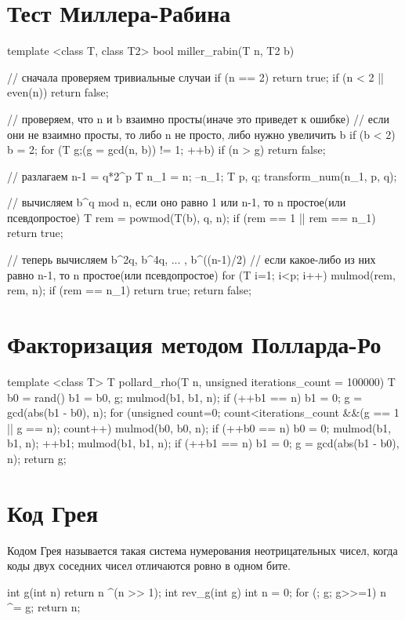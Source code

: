 \documentclass[12pt, titlepage]{article}
\begin{document}
\section{Тест Миллера-Рабина}
\begin{cppcode}
template <class T, class T2>
bool miller_rabin(T n, T2 b)
{
    // сначала проверяем тривиальные случаи
    if (n == 2)
        return true;
    if (n < 2 || even(n))
        return false;

    // проверяем, что n и b взаимно просты(иначе это приведет к ошибке)
    // если они не взаимно просты, то либо n не просто, либо нужно увеличить b
    if (b < 2)
        b = 2;
    for (T g;(g = gcd(n, b)) != 1; ++b)
        if (n > g)
            return false;

    // разлагаем n-1 = q*2^p
    T n_1 = n;
    --n_1;
    T p, q;
    transform_num(n_1, p, q);

    // вычисляем b^q mod n, если оно равно 1 или n-1, то n простое(или псевдопростое)
    T rem = powmod(T(b), q, n);
    if (rem == 1 || rem == n_1)
        return true;

    // теперь вычисляем b^2q, b^4q, ... , b^((n-1)/2)
    // если какое-либо из них равно n-1, то n простое(или псевдопростое)
    for (T i=1; i<p; i++)
    {
        mulmod(rem, rem, n);
        if (rem == n_1)
            return true;
    }
    return false;
}
\end{cppcode}

\section{Факторизация методом Полларда-Ро}
\begin{cppcode}
template <class T>
T pollard_rho(T n, unsigned iterations_count = 100000)
{
    T   b0 = rand() %
        b1 = b0,
        g;
    mulmod(b1, b1, n);
    if (++b1 == n)
        b1 = 0;
    g = gcd(abs(b1 - b0), n);
    for (unsigned count=0; count<iterations_count &&(g == 1 || g == n); count++)
    {
        mulmod(b0, b0, n);
        if (++b0 == n)
            b0 = 0;
        mulmod(b1, b1, n);
        ++b1;
        mulmod(b1, b1, n);
        if (++b1 == n)
            b1 = 0;
        g = gcd(abs(b1 - b0), n);
    }
    return g;
}
\end{cppcode}


\section{Код Грея}
Кодом Грея называется такая система нумерования неотрицательных чисел, когда коды двух соседних чисел отличаются ровно в одном бите.
\begin{cppcode}
int g(int n) {
    return n ^(n >> 1);
}
int rev_g(int g) {
    int n = 0;
    for (; g; g>>=1)
        n ^= g;
    return n;
}
\end{cppcode}
\end{document}
